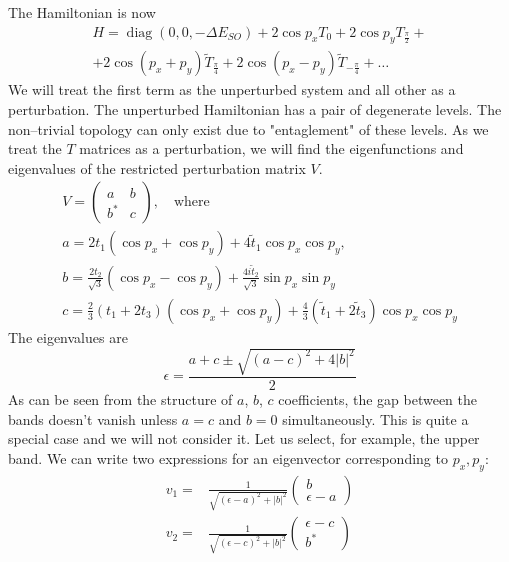 \documentclass{article}
\DeclareMathOperator{\diag}{diag}
\begin{document}
The Hamiltonian is now
\begin{multline}
	H = \diag{(0,0,-\Delta E_{SO})} + 2\cos p_x T_0 + 2\cos p_y T_{\frac{\pi}{2}} + \\
			+ 2\cos{(p_x + p_y)} \tilde{T}_{\frac{\pi}{4}} 
			+ 2\cos{(p_x - p_y)} \tilde{T}_{-\frac{\pi}{4}} + 
			\dots
\end{multline}
We will treat the first term as the unperturbed system and all other as a perturbation. The
unperturbed Hamiltonian has a pair of degenerate levels. The non--trivial topology can only 
exist due to "entaglement" of these levels. 
As we treat the $T$ matrices as a perturbation, we will find the eigenfunctions and 
eigenvalues of the restricted perturbation matrix $V$.
\begin{equation}
	\begin{gathered}
	V =
		 \left(\begin{matrix}
			a & b \\
			b^* & c
		\end{matrix}\right), \quad \text{where} \\
		a = 2t_1(\cos{p_x} + \cos{p_y}) + 4\tilde{t}_1 \cos{p_x}\cos{p_y},\\
		b = \frac{2t_2}{\sqrt{3}}  (\cos{p_x} - \cos{p_y}) 
								+ \frac{4i\tilde{t}_2}{\sqrt{3}}\sin{p_x}\sin{p_y}\\
		c = \frac{2}{3}(t_1 + 2 t_3)(\cos{p_x} + \cos{p_y}) + 
						\frac{4}{3} (\tilde{t}_1 + 2\tilde{t}_3) \cos{p_x} \cos{p_y}
	\end{gathered}
\end{equation}
The eigenvalues are
\begin{equation}
	\epsilon = \frac{a + c \pm \sqrt{(a-c)^2 + 4|b|^2}}{2}
\end{equation}
As can be seen from the structure of $a$, $b$, $c$ coefficients, the gap between the bands 
doesn't vanish unless $a = c$ and $b = 0$ simultaneously. This is quite a special case and 
we will not consider it.
Let us select, for example, the upper band. We can write two expressions for an eigenvector
corresponding to $p_x, p_y$:
\begin{equation}
	\begin{split}
	v_1 =& \frac{1}{\sqrt{(\epsilon-a)^2+|b|^2}} 
			\left(\begin{matrix} b \\ \epsilon-a \end{matrix} \right)\\
	v_2 =& \frac{1}{\sqrt{(\epsilon-c)^2+|b|^2}} 
			\left(\begin{matrix} \epsilon-c \\ b^* \end{matrix} \right)\\
	\end{split}
\end{equation}
\end{document}
